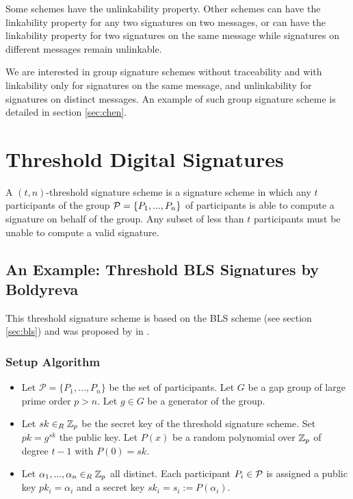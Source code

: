 Some schemes have the unlinkability property. Other schemes can have the linkability property for any two signatures on two messages, or can have the linkability property for two signatures on the same message while signatures on different messages remain unlinkable.

We are interested in group signature schemes without traceability and with linkability only for signatures on the same message, and unlinkability for signatures on distinct messages. An example of such group signature scheme is detailed in section \ref{sec:chen}.

\section{Threshold Digital Signatures}
A $(t,n)$-threshold signature scheme is a signature scheme in which any $t$ participants of the group ${\mathcal P} = \{P_1, ..., P_n \}$ of participants is able to compute a signature on behalf of the group. Any subset of less than $t$ participants must be unable to compute a valid signature.

\subsection{An Example: Threshold BLS Signatures by Boldyreva}
\label{sec:shamir_sig}

This threshold signature scheme is based on the BLS scheme (see section \ref{sec:bls}) and was proposed by \citeauthor{Boldyreva03} in \cite{Boldyreva03}.

\subsubsection*{Setup Algorithm}

\begin{itemize}[align = left, leftmargin=*, label={--}]
\item Let $\mathcal{P}= \{ P_1, \dots , P_n \}$ be the set of participants. Let $G$ be a gap group of large prime order $p > n$. Let $g \in G$ be a generator of the group.

\item Let $sk \in_R {\mathbb Z}_p$ be the secret key of the threshold signature scheme. Set $pk = g^{sk}$ the public key. Let $P(x)$ be a random polynomial over ${\mathbb Z}_p$ of degree $t-1$ with $P(0) = sk$.

\item Let $\alpha_1, ..., \alpha_n \in_R {\mathbb Z}_p$ all distinct. Each participant $P_i \in {\mathcal P}$ is assigned a public key $pk_i = \alpha_i$ and a secret key $sk_i = s_i := P(\alpha_i)$.

\end{itemize}

